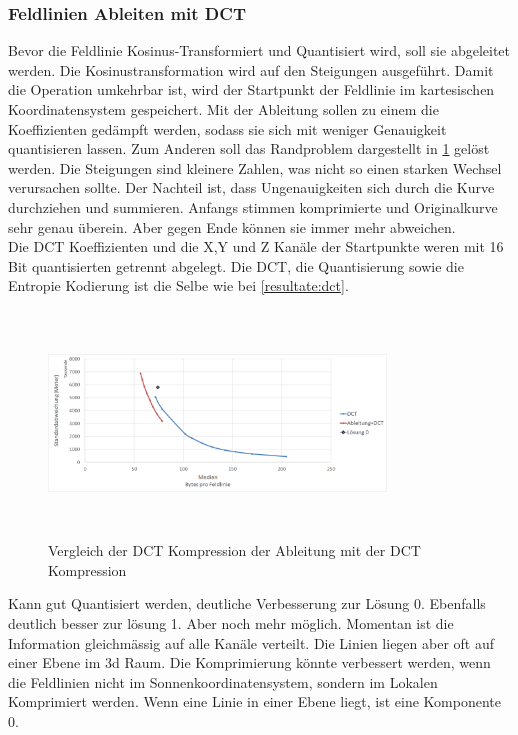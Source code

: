 \subsubsection{Feldlinien Ableiten mit DCT}\label{resultate:dct:ableitung_dct}
Bevor die Feldlinie Kosinus-Transformiert und Quantisiert wird, soll sie abgeleitet werden. Die Kosinustransformation wird auf den Steigungen ausgeführt. Damit die Operation umkehrbar ist, wird der Startpunkt der Feldlinie im kartesischen Koordinatensystem gespeichert. Mit der Ableitung sollen zu einem die Koeffizienten gedämpft werden, sodass sie sich mit weniger Genauigkeit quantisieren lassen. Zum Anderen soll das Randproblem dargestellt in \ref{resultate:loesung1:dct:artefakte} gelöst werden. Die Steigungen sind kleinere Zahlen, was nicht so einen starken Wechsel verursachen sollte. Der Nachteil ist, dass Ungenauigkeiten sich durch die Kurve durchziehen und summieren. Anfangs stimmen komprimierte und Originalkurve sehr genau überein. Aber gegen Ende können sie immer mehr abweichen.\\
Die DCT Koeffizienten und die X,Y und Z Kanäle der Startpunkte weren mit 16 Bit quantisierten getrennt abgelegt. Die DCT, die Quantisierung sowie die Entropie Kodierung ist die Selbe wie bei \ref{resultate:dct}.
\begin{figure}[!htbp]
	\center
	\includegraphics[width=0.8\textwidth,height=6cm,keepaspectratio]{./pictures/resultate/loesung1/loesung1-1/loesung1_1.png}
	\caption{Vergleich der DCT Kompression der Ableitung mit der DCT Kompression}
	\label{resultate:loesung1:dct:artefakte}
\end{figure}
Kann gut Quantisiert werden, deutliche Verbesserung zur Lösung 0. Ebenfalls deutlich besser zur lösung 1. Aber noch mehr möglich. Momentan ist die Information gleichmässig auf alle Kanäle verteilt. Die Linien liegen aber oft auf einer Ebene im 3d Raum. Die Komprimierung könnte verbessert werden, wenn die Feldlinien nicht im Sonnenkoordinatensystem, sondern im Lokalen Komprimiert werden. Wenn eine Linie in einer Ebene liegt, ist eine Komponente 0.

